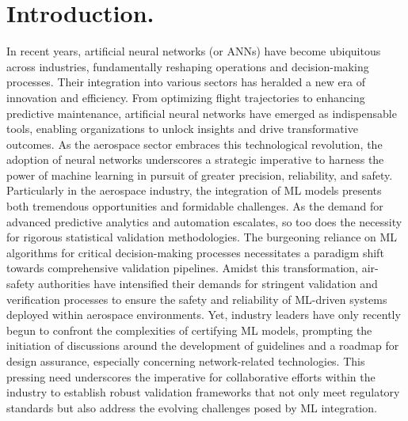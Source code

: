 \chapter{Introduction.}
%
\indent In recent years, artificial neural networks (or ANNs)\cite{Marsland2015Machine} have become ubiquitous across industries, fundamentally reshaping operations and decision-making processes. Their integration into various sectors has heralded a new era of innovation and efficiency. From optimizing flight trajectories\cite{xu2023machine} to enhancing predictive maintenance\cite{shukla2020opportunities,adhikari2018machine,korvesis2017machine}, artificial neural networks have emerged as indispensable tools, enabling organizations to unlock insights and drive transformative outcomes. As the aerospace sector embraces this technological revolution, the adoption of neural networks underscores a strategic imperative to harness the power of machine learning in pursuit of greater precision, reliability, and safety. Particularly in the aerospace industry, the integration of ML models presents both tremendous opportunities and formidable challenges. As the demand for advanced predictive analytics and automation escalates, so too does the necessity for rigorous statistical validation methodologies. The burgeoning reliance on ML algorithms for critical decision-making processes necessitates a paradigm shift towards comprehensive validation pipelines. Amidst this transformation, air-safety authorities have intensified their demands for stringent validation and verification processes\cite{force2021concepts,roadmap2021easa} to ensure the safety and reliability of ML-driven systems deployed within aerospace environments. Yet, industry leaders have only recently begun to confront the complexities of certifying ML models\cite{henderson2022toward,durand2023formal,dmitriev2021toward,el2022certification,paul2023assurance}, prompting the initiation of discussions around the development of guidelines and a roadmap for design assurance, especially concerning network-related technologies. This pressing need underscores the imperative for collaborative efforts within the industry to establish robust validation frameworks that not only meet regulatory standards but also address the evolving challenges posed by ML integration.\\
%
\clearpage
%
